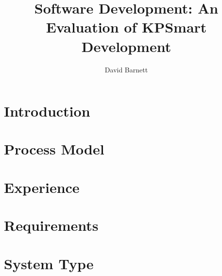 \documentclass{style/CRPITStyle}
\renewcommand{\cite}{\citep}
\begin{document}
\title{Software Development: An Evaluation of KPSmart Development}
\author{David Barnett}

\maketitle

\begin{abstract}
\end{abstract}

\vspace{.1in}

\section{Introduction}

\section{Process Model}

\section{Experience}

\section{Requirements}

\section{System Type}


\cite{lehman:1980}

\vspace{.1in}
\end{document}

